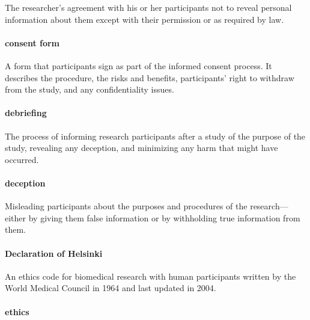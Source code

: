 \documentclass[
]{krantz}
\begin{document}
The researcher's agreement with his or her participants not to reveal personal information about them except with their permission or as required by law.

\hypertarget{consent-form}{%
\paragraph*{consent form}\label{consent-form}}

A form that participants sign as part of the informed consent process. It describes the procedure, the risks and benefits, participants' right to withdraw from the study, and any confidentiality issues.

\hypertarget{debriefing-1}{%
\paragraph*{debriefing}\label{debriefing-1}}

The process of informing research participants after a study of the purpose of the study, revealing any deception, and minimizing any harm that might have occurred.

\hypertarget{deception-1}{%
\paragraph*{deception}\label{deception-1}}

Misleading participants about the purposes and procedures of the research---either by giving them false information or by withholding true information from them.

\hypertarget{declaration-of-helsinki}{%
\paragraph*{Declaration of Helsinki}\label{declaration-of-helsinki}}

An ethics code for biomedical research with human participants written by the World Medical Council in 1964 and last updated in 2004.

\hypertarget{ethics}{%
\paragraph*{ethics}\label{ethics}}
\end{document}
